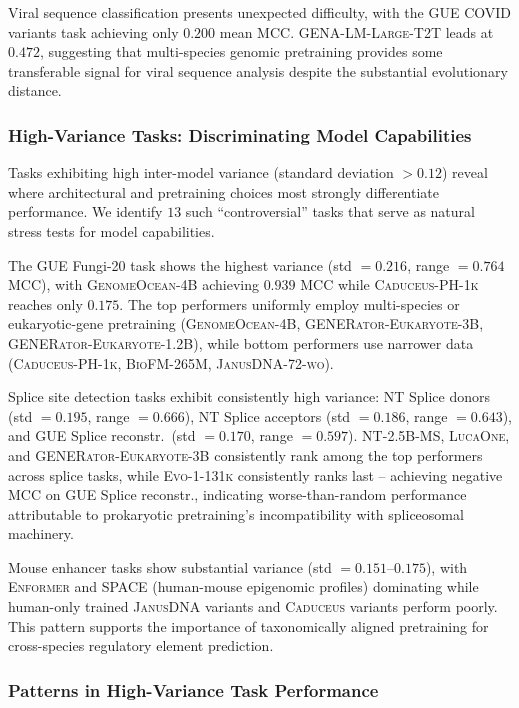 \documentclass{llmxive}
\begin{document}
Viral sequence classification presents unexpected difficulty,
with the GUE COVID variants task achieving only $0.200$ mean
MCC. \textsc{GENA-LM-Large-T2T} leads at $0.472$, suggesting
that multi-species genomic pretraining provides some
transferable signal for viral sequence analysis despite the
substantial evolutionary distance.

\subsubsection{High-Variance Tasks: Discriminating Model
Capabilities}

Tasks exhibiting high inter-model variance (standard deviation
$> 0.12$) reveal where architectural and pretraining choices
most strongly differentiate performance. We identify $13$ such
``controversial'' tasks that serve as natural stress tests for
model capabilities.

The GUE Fungi-20 task shows the highest variance (std $=
0.216$, range $= 0.764$ MCC), with \textsc{GenomeOcean-4B}
achieving $0.939$ MCC while \textsc{Caduceus-PH-1k} reaches only
$0.175$. The top performers uniformly employ multi-species or
eukaryotic-gene pretraining (\textsc{GenomeOcean-4B},
\textsc{GENERator-Eukaryote-3B},
\textsc{GENERator-Eukaryote-1.2B}), while bottom performers use
narrower data (\textsc{Caduceus-PH-1k}, \textsc{BioFM-265M},
\textsc{JanusDNA-72-wo}).

Splice site detection tasks exhibit consistently high variance:
NT Splice donors (std $= 0.195$, range $= 0.666$), NT Splice
acceptors (std $= 0.186$, range $= 0.643$), and GUE Splice
reconstr.\ (std $= 0.170$, range $= 0.597$). \textsc{NT-2.5B-MS},
\textsc{LucaOne}, and \textsc{GENERator-Eukaryote-3B}
consistently rank among the top performers across splice tasks,
while \textsc{Evo-1-131k} consistently ranks last -- achieving
negative MCC on GUE Splice reconstr., indicating
worse-than-random performance attributable to prokaryotic
pretraining's incompatibility with spliceosomal machinery.

Mouse enhancer tasks show substantial variance (std $=
0.151$--$0.175$), with \textsc{Enformer} and \textsc{SPACE}
(human-mouse epigenomic profiles) dominating while human-only
trained \textsc{JanusDNA} variants and \textsc{Caduceus} variants
perform poorly. This pattern supports the importance of
taxonomically aligned pretraining for cross-species regulatory
element prediction.

\subsubsection{Patterns in High-Variance Task Performance}
\end{document}
